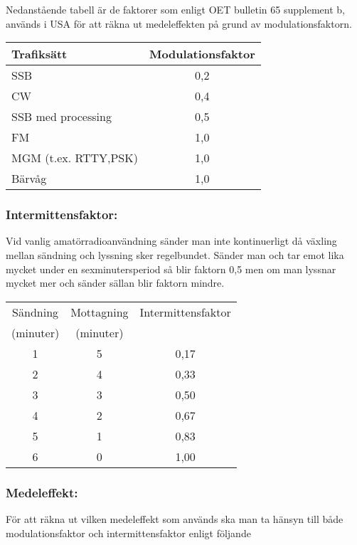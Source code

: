 Nedanstående tabell är de faktorer som enligt OET bulletin 65 supplement b,
\cite{OETbul65b} används i USA för att räkna ut medeleffekten på grund
av modulationsfaktorn.

\begin{tabular}{|l|c|}
	\hline
	Trafiksätt & Modulationsfaktor \\ \hline
	SSB & 0,2 \\ \hline
	CW & 0,4 \\ \hline
	SSB med processing & 0,5 \\ \hline
	FM & 1,0 \\ \hline
	MGM (t.ex. RTTY,PSK) & 1,0 \\ \hline
	Bärvåg & 1,0 \\ \hline
\end{tabular}

\subsubsection{Intermittensfaktor:}

Vid vanlig amatörradioanvändning sänder man inte kontinuerligt då växling
mellan sändning och lyssning sker regelbundet.
Sänder man och tar emot lika mycket under en sexminutersperiod så blir faktorn
0,5 men om man lyssnar mycket mer och sänder sällan blir faktorn mindre.

\begin{tabular}{|c|c|c|}
	\hline
	Sändning  & Mottagning & Intermittensfaktor \\
	(minuter) & (minuter)  & \\ \hline
	1 & 5 & 0,17 \\ \hline
	2 & 4 & 0,33 \\ \hline
	3 & 3 & 0,50 \\ \hline
	4 & 2 & 0,67 \\ \hline
	5 & 1 & 0,83 \\ \hline
	6 & 0 & 1,00 \\ \hline
\end{tabular}

\subsubsection{Medeleffekt:}

För att räkna ut vilken medeleffekt som används ska man ta hänsyn
till både modulationsfaktor och intermittensfaktor enligt följande


